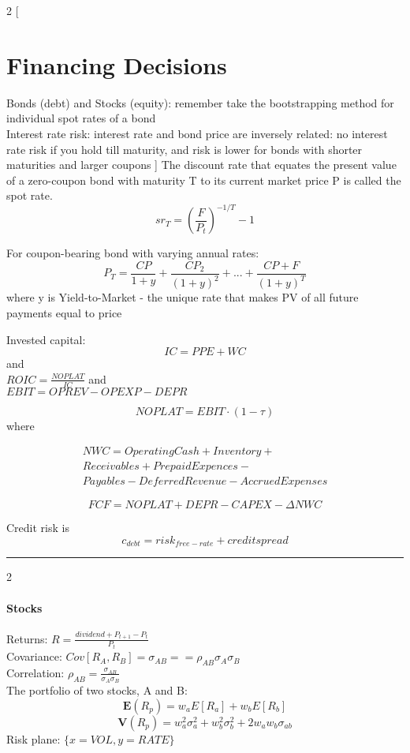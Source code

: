 \documentclass[8pt]{report}
\begin{document}
\begin{multicols}{2}
[
\section{Financing Decisions}
Bonds (debt) and Stocks (equity): remember  take the bootstrapping method for individual spot rates of a bond \\
Interest rate risk: interest rate and bond price are inversely related: no interest rate risk if you hold till maturity, and risk is lower for bonds with shorter maturities and larger coupons
]
The discount rate that equates the present value of a zero-coupon bond
with maturity T to its current market price P is called the spot rate.
$$
	sr_T = (\frac{F}{P_t})^{-1/T} - 1
$$

For coupon-bearing bond with varying annual rates:
$$
	P_T = \frac{CP}{1+y} + \frac{CP_2}{(1+y)^2} + ... + \frac{CP+F}{(1+y)^T}	
$$ where y is Yield-to-Market - the unique rate that makes PV of all future payments equal to price

Invested capital: $$ IC = PPE + WC $$ and \\
$ ROIC = \frac{NOPLAT}{IC} $ and \\
$ EBIT = OPREV - OPEXP - DEPR $

$$ NOPLAT = EBIT \cdot (1 - \tau) $$ where

 \begin{align*}
 NWC = Operating Cash+Inventory + \\ 
 Receivables + 
 Prepaid Expences  - \\ 
 Payables - Deferred Revenue - Accrued Expenses 
 \end{align*}
 

$$
	FCF = NOPLAT + DEPR - CAPEX - \Delta NWC
$$

Credit risk is $$ c_{debt} = risk_{free-rate} + credit spread $$
\end{multicols}
\hrule 
\begin{multicols}{2}
\paragraph{Stocks}
Returns: $ R = \frac{dividend + P_{t+1} - P_t} {P_t}$ \\
Covariance: $ Cov[R_A, R_B] = \sigma_{AB} == \rho_{AB}\sigma_A\sigma_B $ \\
Correlation: $ \rho_{AB} = \frac{\sigma_{AB}} {\sigma_A \sigma_B} $\\


The portfolio of two stocks, A and B: 
$$
	\mathbf{E}(R_p) = w_aE[R_a] + w_bE[R_b]
$$
$$
	\mathbf{V}(R_p) = w_a^2\sigma_a^2 + w_b^2\sigma_b^2 + 2 w_a w_b \sigma_{ab}
$$
Risk plane: $\{x=VOL, y=RATE\}$
\end{multicols}
\end{document}
